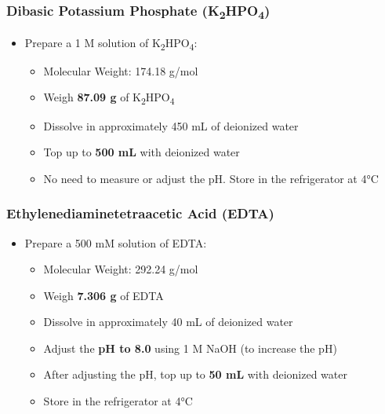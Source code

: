 \documentclass[
  9pt,
  american,
  a5paper,
  extrafontsizes,onecolumn,openright
  ]{memoir}
\providecommand{\tightlist}{%
  \setlength{\itemsep}{0pt}\setlength{\parskip}{0pt}}
\begin{document}
\subsubsection{\texorpdfstring{Dibasic Potassium Phosphate (K\textsubscript{2}HPO\textsubscript{4})}{Dibasic Potassium Phosphate (K2HPO4)}}\label{dibasic-potassium-phosphate-k2hpo4}

\begin{itemize}
\tightlist
\item
  Prepare a 1 M solution of K\textsubscript{2}HPO\textsubscript{4}:

  \begin{itemize}
  \tightlist
  \item
    Molecular Weight: 174.18 g/mol
  \item
    Weigh \textbf{87.09 g} of K\textsubscript{2}HPO\textsubscript{4}
  \item
    Dissolve in approximately 450 mL of deionized water
  \item
    Top up to \textbf{500 mL} with deionized water
  \item
    No need to measure or adjust the pH. Store in the refrigerator at 4°C
  \end{itemize}
\end{itemize}

\subsubsection{Ethylenediaminetetraacetic Acid (EDTA)}\label{ethylenediaminetetraacetic-acid-edta}

\begin{itemize}
\tightlist
\item
  Prepare a 500 mM solution of EDTA:

  \begin{itemize}
  \tightlist
  \item
    Molecular Weight: 292.24 g/mol
  \item
    Weigh \textbf{7.306 g} of EDTA
  \item
    Dissolve in approximately 40 mL of deionized water
  \item
    Adjust the \textbf{pH to 8.0} using 1 M NaOH (to increase the pH)
  \item
    After adjusting the pH, top up to \textbf{50 mL} with deionized water
  \item
    Store in the refrigerator at 4°C
  \end{itemize}
\end{itemize}
\end{document}
